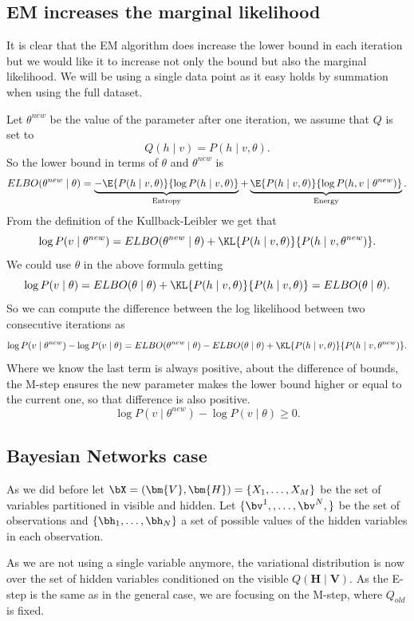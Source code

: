 \subsection{EM increases the marginal likelihood}

It is clear that the EM algorithm does increase the lower bound in each iteration but we would like it to increase not only the bound but also the marginal likelihood. We will be using a single data point as it easy holds by summation when using the full dataset.

Let \(\theta^{new}\) be the value of the parameter after one iteration, we assume that \(Q\) is set to
\[
  Q(h \mid v) = P(h \mid v, \theta).
\]
So the lower bound in terms of \(\theta\) and \(\theta^{new}\) is
\[
  ELBO(\theta^{new} \mid \theta) =  \underbrace{-\E{P(h \mid v, \theta)}{\log{P(h \mid v, \theta)}}}_{\text{Entropy}} + \underbrace{\E{P(h \mid v, \theta)}{\log{P(h,v \mid \theta^{new})}}}_{\text{Energy}}.
\]
From the definition of the Kullback-Leibler we get that
\[
  \log{P(v \mid \theta^{new})} = ELBO(\theta^{new}\mid \theta) + \KL{P(h \mid v, \theta)}{P(h \mid v, \theta^{new})}.
\]
We could use \(\theta\) in the above formula getting
\[
  \log{P(v \mid \theta)} = ELBO(\theta \mid \theta) + \KL{P(h \mid v, \theta)}{P(h \mid v, \theta)} = ELBO(\theta \mid \theta).
\]
So we can compute the difference between the log likelihood between two consecutive iterations as
\[
  \log{P(v \mid \theta^{new})} - \log{P(v \mid \theta)} = ELBO(\theta^{new}\mid \theta) - ELBO(\theta \mid \theta) +  \KL{P(h \mid v, \theta)}{P(h \mid v, \theta^{new})}.
\]
Where we know the last term is always positive, about the difference of bounds, the M-step ensures the new parameter makes the lower bound higher or equal to the current one, so that difference is also positive.
\[
   \log{P(v \mid \theta^{new})} - \log{P(v \mid \theta)} \geq 0.
\]

\subsection{Bayesian Networks case}

As we did before let \(\bX = (\bm{V}, \bm{H}) = \{X_{1}, \dots , X_{M}\}\) be the set of variables partitioned in visible and hidden. Let \(\{\bv^{1},,\dots,\bv^{N},\}\) be the set of observations and \( \{\bh_1,\dots, \bh_N\} \) a set of possible values of the hidden variables in each observation.

As we are not using a single variable anymore, the variational distribution is now over the set of hidden variables conditioned on the visible \(Q(\bm{H} \mid \bm{V})\). As the E-step is the same as in the general case, we are focusing on the M-step, where \(Q_{old}\) is fixed.

